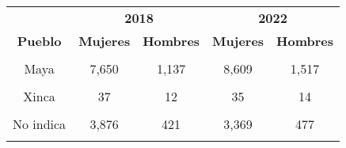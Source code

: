 \begin{tabular}[t]{ccccc}
\toprule
\multicolumn{1}{c}{\textbf{ }} & \multicolumn{2}{c}{\textbf{2018}} & \multicolumn{2}{c}{\textbf{2022}} \\
\cmidrule(l{3pt}r{3pt}){2-3} \cmidrule(l{3pt}r{3pt}){4-5}
\textbf{Pueblo} & \textbf{Mujeres} & \textbf{Hombres} & \textbf{Mujeres} & \textbf{Hombres}\\
\midrule
\cellcolor[HTML]{B6B3FF}{Ladinos} & \cellcolor[HTML]{B6B3FF}{14,320} & \cellcolor[HTML]{B6B3FF}{2,118} & \cellcolor[HTML]{B6B3FF}{19,133} & \cellcolor[HTML]{B6B3FF}{3,315}\\
Maya & 7,650 & 1,137 & 8,609 & 1,517\\
\cellcolor[HTML]{B6B3FF}{Garifuna} & \cellcolor[HTML]{B6B3FF}{46} & \cellcolor[HTML]{B6B3FF}{11} & \cellcolor[HTML]{B6B3FF}{40} & \cellcolor[HTML]{B6B3FF}{6}\\
Xinca & 37 & 12 & 35 & 14\\
\cellcolor[HTML]{B6B3FF}{Otro} & \cellcolor[HTML]{B6B3FF}{91} & \cellcolor[HTML]{B6B3FF}{10} & \cellcolor[HTML]{B6B3FF}{152} & \cellcolor[HTML]{B6B3FF}{25}\\
No indica & 3,876 & 421 & 3,369 & 477\\
\cellcolor[HTML]{B6B3FF}{Ignorado} & \cellcolor[HTML]{B6B3FF}{234} & \cellcolor[HTML]{B6B3FF}{29} & \cellcolor[HTML]{B6B3FF}{400} & \cellcolor[HTML]{B6B3FF}{102}\\
\bottomrule
\end{tabular}
